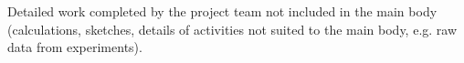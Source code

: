 \color{red}
Detailed work completed by the project team not included in the main body (calculations, sketches, details of activities not suited to the main body, e.g. raw data from experiments).
\color{black}